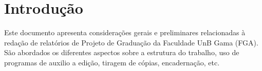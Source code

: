 \chapter*[Introdução]{Introdução}

Este documento apresenta considerações gerais e preliminares relacionadas 
à redação de relatórios de Projeto de Graduação da Faculdade UnB Gama 
(FGA). São abordados os diferentes aspectos sobre a estrutura do trabalho, 
uso de programas de auxilio a edição, tiragem de cópias, encadernação, etc.
